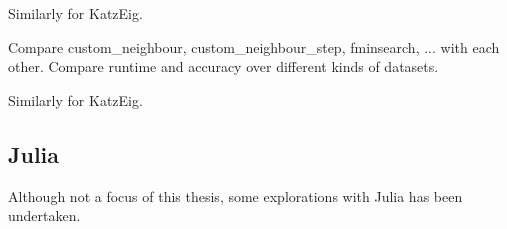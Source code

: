 Similarly for KatzEig.


Compare custom\_neighbour, custom\_neighbour\_step, fminsearch, ... with each other. Compare runtime and accuracy over different kinds of datasets.

Similarly for KatzEig.



\subsection{Julia}\label{subsec:res:julia}


Although not a focus of this thesis, some explorations with Julia has been undertaken.


%
%
%
